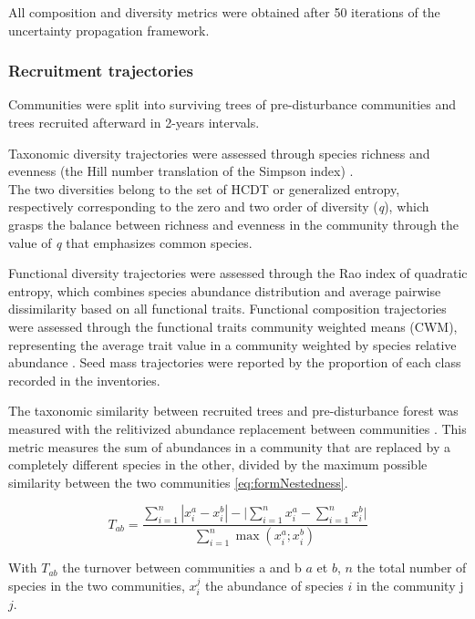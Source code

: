 \documentclass[
  11pt,
  french,
  A4paper,
  extrafontsizes,onecolumn,openright
  ]{memoir}
\begin{document}
All composition and diversity metrics were obtained after 50 iterations
of the uncertainty propagation framework.

\subsubsection{Recruitment trajectories}\label{recruitment-trajectories}

Communities were split into surviving trees of pre-disturbance
communities and trees recruited afterward in 2-years intervals.

Taxonomic diversity trajectories were assessed through species richness
and evenness (the Hill number translation of the Simpson index)
\autocites{Chao2015}{Marcon2015b}.\\
The two diversities belong to the set of HCDT or generalized entropy,
respectively corresponding to the zero and two order of diversity
(\emph{q}), which grasps the balance between richness and evenness in
the community through the value of \emph{q} that emphasizes common
species.

Functional diversity trajectories were assessed through the Rao index of
quadratic entropy, which combines species abundance distribution and
average pairwise dissimilarity based on all functional traits.
Functional composition trajectories were assessed through the functional
traits community weighted means (CWM), representing the average trait
value in a community weighted by species relative abundance
\autocite{Diaz2007}. Seed mass trajectories were reported by the
proportion of each class recorded in the inventories.

The taxonomic similarity between recruited trees and pre-disturbance
forest was measured with the relitivized abundance replacement between
communities \autocite{Podani2013}. This metric measures the sum of
abundances in a community that are replaced by a completely different
species in the other, divided by the maximum possible similarity between
the two communities \eqref{eq:formNestedness}.

\begin{equation}
T_{ab}=\frac{\sum_{i=1}^{n}|x_i^a - x_i^b| - \bigg| \sum_{i=1}^{n}{x_i^a} - \sum_{i=1}^{n}{x_i^b} \bigg|}{\sum_{i=1}^{n}\max{\left( x_i^a;x_i^b \right)}}
\label{eq:formNestedness}
\end{equation}

With \(T_{ab}\) the turnover between communities a and b \(a\) et \(b\),
\(n\) the total number of species in the two communities, \(x_i^j\) the
abundance of species \(i\) in the community j \(j\).
\end{document}
